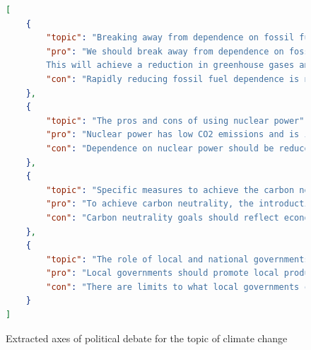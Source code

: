 \documentclass[final,5p,times,twocolumn,authoryear]{elsarticle}
\begin{document}
\begin{figure}[h]
\centering
      \begin{lstlisting}[language=json,firstnumber=1]
[
    {
        "topic": "Breaking away from dependence on fossil fuels and promoting renewable energy",
        "pro": "We should break away from dependence on fossil fuels and expand the use of renewable energy to the maximum extent possible.
        This will achieve a reduction in greenhouse gases and increase energy self-sufficiency." ,
        "con": "Rapidly reducing fossil fuel dependence is not realistic and may make it difficult to ensure a stable energy supply. The costs and technical constraints of renewable energy also need to be carefully evaluated."
    },
    {
        "topic": "The pros and cons of using nuclear power",
        "pro": "Nuclear power has low CO2 emissions and is important for a stable energy supply. Once its technical safety is ensured, it should be restarted and contribute to decarbonization." ,
        "con": "Dependence on nuclear power should be reduced and the spread of renewable energy should be promoted. Oppose new construction and increased dependence on nuclear power due to the risk of nuclear accidents and waste issues."
    },
    {
        "topic": "Specific measures to achieve the carbon neutrality goal", {
        "pro": "To achieve carbon neutrality, the introduction of renewable energy should be accelerated through technological innovation and government support. Utilization of hydrogen and ammonia and resource recycling are important." ,.
        "con": "Carbon neutrality goals should reflect economic and industrial realities and avoid abrupt shifts. A realistic approach that takes into account immediate economic effects and increased burdens is needed."
    },
    {
        "topic": "The role of local and national governments in combating climate change", {
        "pro": "Local governments should promote local production and local consumption of renewable energy by taking advantage of the characteristics of local resources, and the national government should prepare financial support and policies to encourage this." ,
        "con": "There are limits to what local governments can do to combat climate change on their own, and a unified and comprehensive policy should be promoted under the leadership of the national government. Local initiatives should only play a complementary role."
    }
]
\end{lstlisting}

\caption{Extracted axes of political debate for the topic of climate change}
\label{fig: extracted axes climate change}
\end{figure}
\end{document}

